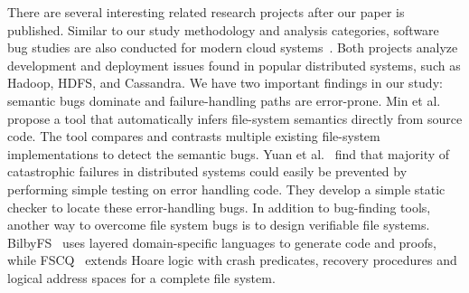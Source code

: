 
There are several interesting related research projects after our
paper is published. Similar to our study methodology and analysis
categories, software bug studies are also conducted for modern cloud
systems~\cite{cloud-bug1,cloud-bug2}. Both projects analyze development
and deployment issues found in popular distributed systems, such as
Hadoop, HDFS, and Cassandra. We have two important findings in our
study: semantic bugs dominate and failure-handling paths are
error-prone.  Min et al.~\cite{MinEtAl15-SOSP} propose a tool that
automatically infers file-system semantics directly from source
code. The tool compares and contrasts multiple existing file-system
implementations to detect the semantic bugs. Yuan et
al.~\cite{YuanEtAl14-OSDI} find that majority of catastrophic failures 
in distributed systems could easily be prevented by performing simple
testing on error handling code. They develop a simple static checker
to locate these error-handling bugs. In addition to bug-finding tools,
another way to overcome file system bugs is to design verifiable
file systems. BilbyFS~\cite{verify1} uses layered domain-specific
languages to generate code and proofs, while FSCQ~\cite{verify2}
extends Hoare logic with crash predicates, recovery procedures and
logical address spaces for a complete file system. 

